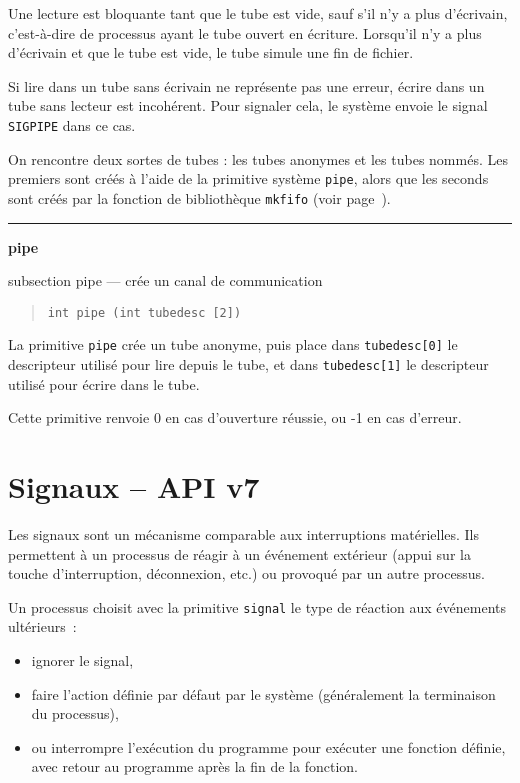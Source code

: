\documentclass [twoside] {report}
\newcommand {\primitive} [1]
    {
	\phantomsection
	{\large \textbf {#1}}
	\addcontentsline {toc} {subsection} {#1}
    }
\newcommand {\separation}
    {
	\vspace {5mm}
	\nopagebreak
	\hrule
    }
\begin{document}
Une lecture est bloquante tant que le tube est vide, sauf s'il n'y a
plus d'écrivain, c'est-à-dire de processus ayant le tube ouvert en
écriture. Lorsqu'il n'y a plus d'écrivain et que le tube est vide,
le tube simule une fin de fichier.

Si lire dans un tube sans écrivain ne représente pas une erreur,
écrire dans un tube sans lecteur est incohérent. Pour signaler
cela, le système envoie le signal \texttt {SIGPIPE} dans ce cas.

On rencontre deux sortes de tubes : les tubes anonymes et
les tubes nommés. Les premiers sont créés à l'aide de la
primitive système \texttt {pipe}, alors que les seconds sont créés par
la fonction de bibliothèque \texttt {mkfifo} (voir page~\pageref {mkfifo}).


\separation
\primitive {pipe} --- crée un canal de communication

\begin {quote}
\begin {verbatim}
int pipe (int tubedesc [2])
\end{verbatim}
\end {quote}

La primitive \texttt {pipe} crée un tube anonyme,
puis place dans \texttt {tubedesc[0]}
le descripteur utilisé pour lire depuis le tube, et dans
\texttt {tubedesc[1]} le descripteur utilisé pour écrire dans le tube.

Cette primitive renvoie 0 en cas d'ouverture
réussie, ou -1 en cas d'erreur.






\section {Signaux -- API v7}


Les signaux sont un mécanisme comparable aux interruptions
matérielles. Ils permettent à un processus de réagir à un
événement extérieur (appui sur la touche d'interruption,
déconnexion, etc.) ou provoqué par un autre processus.

Un processus choisit avec la primitive \texttt {signal}
le type de réaction aux événements ultérieurs~:

\begin {itemize}
    \item ignorer le signal,
    \item faire l'action définie par défaut par le
	système (généralement la terminaison du processus),
    \item ou interrompre l'exécution du programme pour exécuter
	une fonction définie, avec retour au programme après
	la fin de la fonction.
\end {itemize}
\end{document}
